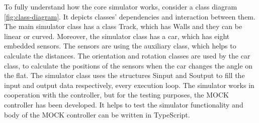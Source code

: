 To fully understand how the core simulator works, consider a class diagram \ref{fig:class-diagram}. It depicts classes' dependencies and interaction between them. The main simulator class has a class Track, which has Walls and they can be linear or curved. Moreover, the simulator class has a car, which has eight embedded sensors. The sensors are using the auxiliary class, which helps to calculate the distances. The orientation and rotation classes are used by the car class, to calculate the positions of the sensors when the car changes the angle on the flat. The simulator class uses the structures Sinput and Soutput to fill the input and output data respectively, every execution loop. The simulator works in cooperation with the controller, but for the testing purposes, the MOCK controller has been developed. It helps to test the simulator functionality and body of the MOCK controller can be written in TypeScript.
